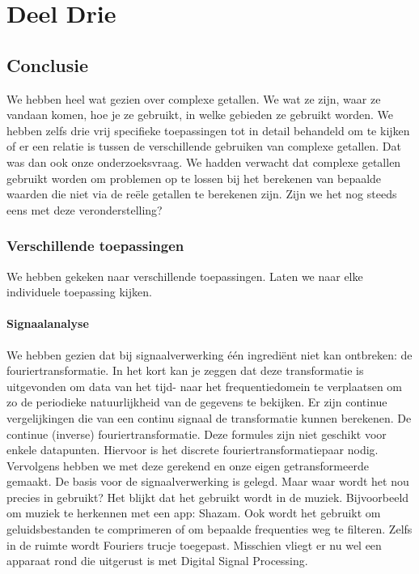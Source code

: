 \documentclass[11pt,fleqn]{book} %
\begin{document}

\part{Deel Drie}


\chapter{Conclusie}
We hebben heel wat gezien over complexe getallen. We wat ze zijn, waar ze vandaan komen, hoe je ze gebruikt, in welke gebieden ze gebruikt worden. We hebben zelfs drie vrij specifieke toepassingen tot in detail behandeld om te kijken of er een relatie is tussen de verschillende gebruiken van complexe getallen.
Dat was dan ook onze onderzoeksvraag. We hadden verwacht dat complexe getallen gebruikt worden om problemen op te lossen bij het berekenen van bepaalde waarden die niet via de reële getallen te berekenen zijn. Zijn we het nog steeds eens met deze veronderstelling?

\section{Verschillende toepassingen}
We hebben gekeken naar verschillende toepassingen. Laten we naar elke individuele toepassing kijken.

\subsection{Signaalanalyse}
We hebben gezien dat bij signaalverwerking één ingrediënt niet kan ontbreken: de fouriertransformatie. In het kort kan je zeggen dat deze transformatie is uitgevonden om data van het tijd- naar het frequentiedomein te verplaatsen om zo de periodieke natuurlijkheid van de gegevens te bekijken. Er zijn continue vergelijkingen die van een continu signaal de transformatie kunnen berekenen. De continue (inverse) fouriertransformatie. Deze formules zijn niet geschikt voor enkele datapunten. Hiervoor is het discrete fouriertransformatiepaar nodig. Vervolgens hebben we met deze gerekend en onze eigen getransformeerde gemaakt.
De basis voor de signaalverwerking is gelegd. Maar waar wordt het nou precies in gebruikt? Het blijkt dat het gebruikt wordt in de muziek. Bijvoorbeeld om muziek te herkennen met een app: Shazam. Ook wordt het gebruikt om geluidsbestanden te comprimeren of om bepaalde frequenties weg te filteren. Zelfs in de ruimte wordt Fouriers trucje toegepast. Misschien vliegt er nu wel een apparaat rond die uitgerust is met Digital Signal Processing.
\end{document}
